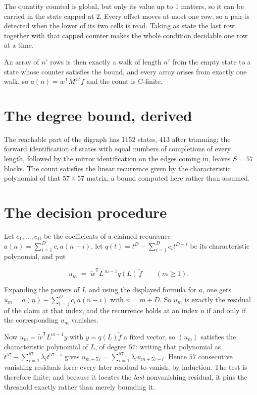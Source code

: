 \documentclass[11pt]{article}
\theoremstyle{definition}
\begin{document}
The quantity counted is global, but only its value up to $1$ matters, so it can be carried in the state capped at $2$. Every offset moves at most one row, so a pair is detected when the lower of its two cells is read. Taking as state the last row together with that capped counter makes the whole condition decidable one row at a time.

An array of $n'$ rows is then exactly a walk of length $n'$ from the empty state to a state whose counter satisfies the bound, and every array arises from exactly one walk, so $a(n) = w^{\mathsf T}M^{\,n'}f$ and the count is C-finite.

\section{The degree bound, derived}

The reachable part of the digraph has $1152$ states, $413$ after trimming; the forward identification of states with equal numbers of completions of every length, followed by the mirror identification on the edges coming in, leaves $S = 57$ blocks. The count satisfies the linear recurrence given by the characteristic polynomial of that $57\times57$ matrix, a bound computed here rather than assumed.

\section{The decision procedure}

Let $c_1,\dots,c_D$ be the coefficients of a claimed recurrence $a(n) = \sum_{i=1}^{D} c_i\,a(n-i)$, let $q(t) = t^{D} - \sum_{i=1}^{D} c_i t^{D-i}$ be its characteristic polynomial, and put

\[u_m \;=\; \tilde w^{\mathsf T} L^{\,m-1} q(L)\,\tilde f \qquad (m \ge 1).\]

Expanding the powers of $L$ and using the displayed formula for $a$, one gets $u_m = a(n) - \sum_{i=1}^{D} c_i\,a(n-i)$ with $n = m + D$. So $u_m$ is exactly the residual of the claim at that index, and the recurrence holds at an index $n$ if and only if the corresponding $u_m$ vanishes.

Now $u_m = \tilde w^{\mathsf T} L^{m-1} y$ with $y = q(L)\tilde f$ a fixed vector, so $(u_m)$ satisfies the characteristic polynomial of $L$, of degree $57$: writing that polynomial as $t^{57} - \sum_{i=1}^{57} \lambda_i t^{57-i}$ gives $u_{m+57} = \sum_{i=1}^{57} \lambda_i u_{m+57-i}$. Hence $57$ consecutive vanishing residuals force every later residual to vanish, by induction. The test is therefore finite; and because it locates the {\itshape last} nonvanishing residual, it pins the threshold exactly rather than merely bounding it.
\end{document}

